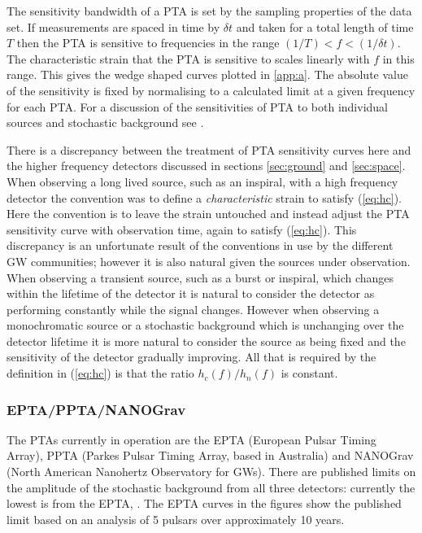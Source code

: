 The sensitivity bandwidth of a PTA is set by the sampling properties of the data set. If measurements are spaced in time by $\delta t$ and taken for a total length of time $T$ then the PTA is sensitive to frequencies in the range $(1/T)<f<(1/\delta t)$. The characteristic strain that the PTA is sensitive to scales linearly with $f$ in this range. This gives the wedge shaped curves plotted in \ref{app:a}. The absolute value of the sensitivity is fixed by normalising to a calculated limit at a given frequency for each PTA. For a discussion of the sensitivities of PTA to both individual sources and stochastic background see \cite{MooreTaylorGair}.

There is a discrepancy between the treatment of PTA sensitivity curves here and the higher frequency detectors discussed in sections \ref{sec:ground} and \ref{sec:space}. When observing a long lived source, such as an inspiral, with a high frequency detector the convention was to define a \emph{characteristic} strain to satisfy (\ref{eq:hc}). Here the convention is to leave the strain untouched and instead adjust the PTA sensitivity curve with observation time, again to satisfy (\ref{eq:hc}). This discrepancy is an unfortunate result of the conventions in use by the different GW communities; however it is also natural given the sources under observation. When observing a transient source, such as a burst or inspiral, which changes within the lifetime of the detector it is natural to consider the detector as performing constantly while the signal changes. However when observing a monochromatic source or a stochastic background which is unchanging over the detector lifetime it is more natural to consider the source as being fixed and the sensitivity of the detector gradually improving. All that is required by the definition in (\ref{eq:hc}) is that the ratio $h_{c}(f)/h_{n}(f)$ is constant.



\subsubsection{EPTA/PPTA/NANOGrav}
The PTAs currently in operation are the EPTA (European Pulsar Timing Array), PPTA (Parkes Pulsar Timing Array, based in  Australia) and NANOGrav (North American Nanohertz Observatory for GWs). There are published limits on the amplitude of the stochastic background from all three detectors: currently the lowest is from the EPTA, \cite{Haasteren}. The EPTA curves in the figures show the  published limit based on an analysis of 5 pulsars over approximately 10 years.

